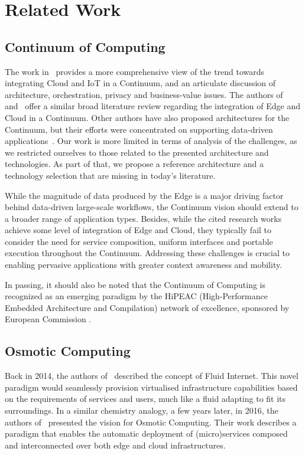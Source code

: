 \section{Related Work}\label{sec:RelW}

\subsection{Continuum of Computing}

The work in~\cite{lynn2020cloud} provides a more comprehensive view of the trend towards integrating Cloud and IoT in a Continuum, and an articulate discussion of architecture, orchestration, privacy and business-value issues. 
The authors of~\cite{santos2021towards} and~\cite{BITTENCOURT2018134} offer a similar broad literature review regarding the integration of Edge and Cloud in a Continuum. 
Other authors have also proposed architectures for the Continuum, but their efforts were concentrated on supporting data-driven applications~\cite{risco2021serverless, balouek2019towards, abdelbaky2017computing}. 
Our work is more limited in terms of analysis of the challenges, as we restricted ourselves to those related to the presented architecture and technologies. As part of that, we propose a reference architecture and a technology selection that are missing in today's literature.

While the magnitude of data produced by the Edge is a major driving factor behind data-driven large-scale workflows, the Continuum vision should extend to a broader range of application types. 
Besides, while the cited research works achieve some level of integration of Edge and Cloud, they typically fail to consider the need for service composition, uniform interfaces and portable execution throughout the Continuum. Addressing these challenges is crucial to enabling pervasive applications with greater context awareness and mobility.

In passing, it should also be noted that the Continuum of Computing is recognized as an emerging paradigm by the HiPEAC (High-Performance Embedded Architecture and Compilation) network of excellence, sponsored by European Commission \cite{hipeac}.

\subsection{Osmotic Computing}

Back in 2014, the authors of~\cite{latre2014fluid} described the concept of Fluid Internet. This novel paradigm would seamlessly provision virtualised infrastructure capabilities based on the requirements of services and users, much like a fluid adapting to fit its surroundings. In a similar chemistry analogy, a few years later, in 2016, the authors of~\cite{villari2016osmotic} presented the vision for Osmotic Computing. Their work describes a paradigm that enables the automatic deployment of (micro)services composed and interconnected over both edge and cloud infrastructures.

